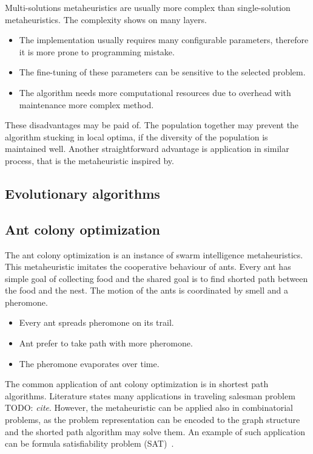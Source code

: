 \documentclass[
  print, %
  Table,   %
  nolof,     %
  nolot,     %
  11pt, %
  oneside  %
]{fithesis3}
\newcommand{\todo}[1]{TODO: \textit{#1}}
\begin{document}
Multi-solutions metaheuristics are usually more complex than single-solution metaheuristics. The complexity shows on many layers.

\begin{itemize}
    \item The implementation usually requires many configurable parameters, therefore it is more prone to programming mistake.
    \item The fine-tuning of these parameters can be sensitive to the selected problem.
    \item The algorithm needs more computational resources due to overhead with maintenance more complex method.
\end{itemize}

These disadvantages may be paid of. The population together may prevent the algorithm stucking in local optima, if the diversity of the population is maintained well. Another straightforward advantage is application in similar process, that is the metaheuristic inspired by.

\subsection{Evolutionary algorithms}
\label{subsec:opt-multi-sol-ea}



\subsection{Ant colony optimization}
\label{subsec:opt-multi-sol-aco}

The ant colony optimization is an instance of swarm intelligence metaheuristics. This metaheuristic imitates the cooperative behaviour of ants. Every ant has simple goal of collecting food and the shared goal is to find shorted path between the food and the nest. The motion of the ants is coordinated by smell and a pheromone.

\begin{itemize}
    \item Every ant spreads pheromone on its trail.
    \item Ant prefer to take path with more pheromone.
    \item The pheromone evaporates over time.
\end{itemize}

The common application of ant colony optimization is in shortest path algorithms. Literature states many applications in traveling salesman problem \todo{cite}. However, the metaheuristic can be applied also in combinatorial problems, as the problem representation can be encoded to the graph structure and the shorted path algorithm may solve them. An example of such application can be formula satisfiability problem (SAT)~\cite{moritz2010solving}.
\end{document}
